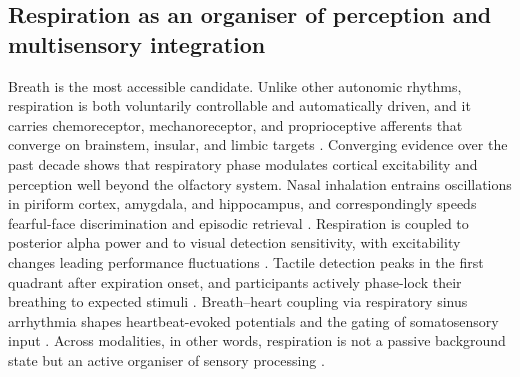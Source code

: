 \subsection{Respiration as an organiser of perception and multisensory integration}


Breath is the most accessible candidate. Unlike other autonomic rhythms, respiration is both voluntarily controllable and automatically driven, and it carries chemoreceptor, mechanoreceptor, and proprioceptive afferents that converge on brainstem, insular, and limbic targets \citep{Chan2024, Varga2017, heck2017breathing, Zelano2022}. Converging evidence over the past decade shows that respiratory phase modulates cortical excitability and perception well beyond the olfactory system. Nasal inhalation entrains oscillations in piriform cortex, amygdala, and hippocampus, and correspondingly speeds fearful-face discrimination and episodic retrieval \citep{zelano2016nasal, mizuhara_2023}. Respiration is coupled to posterior alpha power and to visual detection sensitivity, with excitability changes leading performance fluctuations \citep{kluger_2021}. Tactile detection peaks in the first quadrant after expiration onset, and participants actively phase-lock their breathing to expected stimuli \citep{grund_2021}. Breath--heart coupling via respiratory sinus arrhythmia shapes heartbeat-evoked potentials and the gating of somatosensory input \citep{Zaccaro2022, Heck2022}. Across modalities, in other words, respiration is not a passive background state but an active organiser of sensory processing \citep{Zelano2022, Heck2022}.

